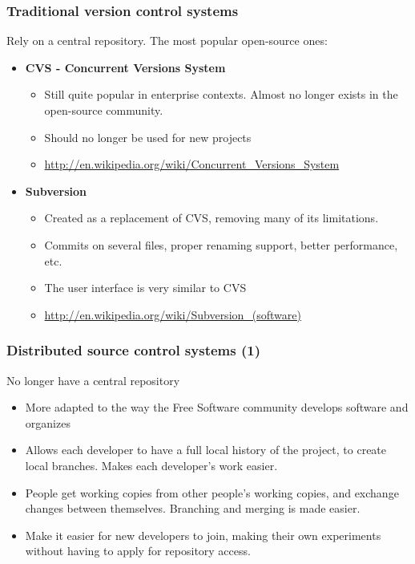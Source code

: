 \begin{frame}
  \frametitle{Traditional version control systems} Rely on a central
  repository. The most popular open-source ones:
  \begin{itemize}
  \item {\bf CVS - Concurrent Versions System}
    \begin{itemize}
    \item Still quite popular in enterprise contexts. Almost no longer
      exists in the open-source community.
    \item Should no longer be used for new projects
    \item
      \url{http://en.wikipedia.org/wiki/Concurrent_Versions_System}
    \end{itemize}
  \item {\bf Subversion}
    \begin{itemize}
    \item Created as a replacement of CVS, removing many of its
      limitations.
    \item Commits on several files, proper renaming support, better
      performance, etc.
    \item The user interface is very similar to CVS
    \item \url{http://en.wikipedia.org/wiki/Subversion_(software)}
    \end{itemize}
  \end{itemize}
\end{frame}

\begin{frame}
  \frametitle{Distributed source control systems (1)}
  No longer have a central repository
  \begin{itemize}
  \item More adapted to the way the Free Software community develops
    software and organizes
  \item Allows each developer to have a full local history of the
    project, to create local branches. Makes each developer's work
    easier.
  \item People get working copies from other people's working copies,
    and exchange changes between themselves. Branching and merging is
    made easier.
  \item Make it easier for new developers to join, making their own
    experiments without having to apply for repository access.
  \end{itemize}
\end{frame}

